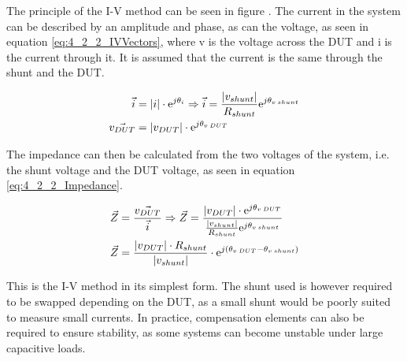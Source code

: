 The principle of the I-V method can be seen in figure . The current in the system can be described by an amplitude and phase, as can the voltage, as seen in equation \ref{eq:4_2_2_IVVectors}, where v is the voltage across the DUT and i is the current through it. It is assumed that the current is the same through the shunt and the DUT.

\begin{equation}
    \label{eq:4_2_2_IVVectors}
    \begin{split}
        \vec{i} & = |i|\cdot\mathrm{e} ^{j\theta_i} \Rightarrow \vec{i} = \frac{|v_{shunt}|}{R_{shunt}}\mathrm{e} ^{j\theta_{v\:shunt}}\\
        \vec{v_{DUT}} & = |v_{DUT}| \cdot\mathrm{e} ^{j\theta_{v\:DUT}}
    \end{split}
\end{equation}

The impedance can then be calculated from the two voltages of the system, i.e. the shunt voltage and the DUT voltage, as seen in equation \ref{eq:4_2_2_Impedance}.

\begin{equation}
    \label{eq:4_2_2_Impedance}
    \begin{split}
        \vec{Z} & = \frac{\vec{v_{DUT}}}{\vec{i}} \Rightarrow \vec{Z} = \frac{|v_{DUT}| \cdot\mathrm{e} ^{j\theta_{v\:DUT}}}{\frac{|v_{shunt}|}{R_{shunt}}\mathrm{e} ^{j\theta_{v\:shunt}}} \\
        \vec{Z} & = \frac{|v_{DUT}|\cdot R_{shunt}}{|v_{shunt}|}\cdot \mathrm{e} ^{j\left(\theta_{v\:DUT}-\theta_{v\:shunt}\right)}
    \end{split}
\end{equation}

This is the I-V method in its simplest form. The shunt used is however required to be swapped depending on the DUT, as a small shunt would be poorly suited to measure small currents. In practice, compensation elements can also be required to ensure stability, as some systems can become unstable under large capacitive loads.